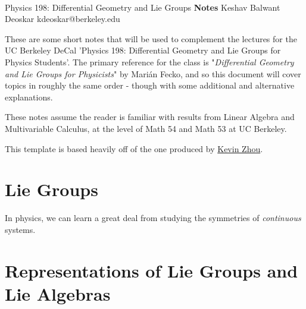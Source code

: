 \documentclass[11pt]{article}
\begin{document}
\thispagestyle{empty}
\bigskip \
\vspace{0.1cm}

\begin{center}
{\fontsize{22}{22} \selectfont Physics 198: Differential Geometry and Lie Groups}
\vskip 16pt
{\fontsize{36}{36} \selectfont \bf \sffamily Notes}
\vskip 24pt
{\fontsize{18}{18} \selectfont \rmfamily Keshav Balwant Deoskar} 
\vskip 6pt
{\fontsize{14}{14} \selectfont \ttfamily kdeoskar@berkeley.edu} 
\vskip 24pt
\end{center}



These are some short notes that will be used to complement the lectures for the UC Berkeley DeCal 'Physics 198: Differential Geometry and Lie Groups for Physics Students'. The primary reference for the class is "\textit{Differential Geometry and Lie Groups for Physicists}" by Marián Fecko, and so this document will cover topics in roughly the same order - though with some additional and alternative explanations.


\vskip 0.5cm
These notes assume the reader is familiar with results from Linear Algebra and Multivariable Calculus, at the level of Math 54 and Math 53 at UC Berkeley.

\vskip 0.5cm
This template is based heavily off of the one produced by \href{https://knzhou.github.io/}{Kevin Zhou}.

\tableofcontents 


\newpage
\section{Lie Groups}

\vskip 0.5cm
In physics, we can learn a great deal from studying the symmetries of \emph{continuous} systems. 


\newpage
\section{Representations of Lie Groups and Lie Algebras}
\end{document}

